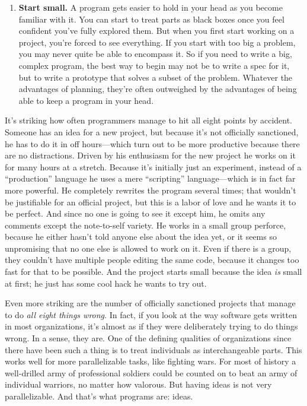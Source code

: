 \documentclass[12pt]{book}
\begin{document}
\begin{enumerate}
  If you want to put several people to work on a project, divide it into
  components and give each to one person.
\item
  \textbf{Start small.} A program gets easier to hold in your head as
  you become familiar with it. You can start to treat parts as black
  boxes once you feel confident you've fully explored them. But when you
  first start working on a project, you're forced to see everything. If
  you start with too big a problem, you may never quite be able to
  encompass it. So if you need to write a big, complex program, the best
  way to begin may not be to write a spec for it, but to write a
  prototype that solves a subset of the problem. Whatever the advantages
  of planning, they're often outweighed by the advantages of being able
  to keep a program in your head.
\end{enumerate}

It's striking how often programmers manage to hit all eight points by
accident. Someone has an idea for a new project, but because it's not
officially sanctioned, he has to do it in off hours---which turn out to
be more productive because there are no distractions. Driven by his
enthusiasm for the new project he works on it for many hours at a
stretch. Because it's initially just an experiment, instead of a
``production'' language he uses a mere ``scripting'' language---which is
in fact far more powerful. He completely rewrites the program several
times; that wouldn't be justifiable for an official project, but this is
a labor of love and he wants it to be perfect. And since no one is going
to see it except him, he omits any comments except the note-to-self
variety. He works in a small group perforce, because he either hasn't
told anyone else about the idea yet, or it seems so unpromising that no
one else is allowed to work on it. Even if there is a group, they
couldn't have multiple people editing the same code, because it changes
too fast for that to be possible. And the project starts small because
the idea \emph{is} small at first; he just has some cool hack he wants
to try out.

Even more striking are the number of officially sanctioned projects that
manage to do \emph{all eight things wrong}. In fact, if you look at the
way software gets written in most organizations, it's almost as if they
were deliberately trying to do things wrong. In a sense, they are. One
of the defining qualities of organizations since there have been such a
thing is to treat individuals as interchangeable parts. This works well
for more parallelizable tasks, like fighting wars. For most of history a
well-drilled army of professional soldiers could be counted on to beat
an army of individual warriors, no matter how valorous. But having ideas
is not very parallelizable. And that's what programs are: ideas.
\end{document}
